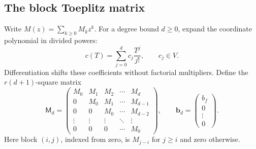 \documentclass[11pt,a4paper]{article}
\numberwithin{equation}{section}
\theoremstyle{definition}
\theoremstyle{remark}
\theoremstyle{definition}
\newcommand{\Tmat}{\mathsf M}
\begin{document}
\subsection{The block Toeplitz matrix}
Write $M(z)=\sum_{k\ge0}M_kz^k$. For a degree bound $d\ge0$, expand the coordinate polynomial in divided powers:
\begin{equation}
 c(T)=\sum_{j=0}^{d}c_j\frac{T^j}{j!},\qquad c_j\in V.
 \label{eq:divided}
\end{equation}
Differentiation shifts these coefficients without factorial multipliers. Define the $r(d+1)$-square matrix
\begin{equation}
 \Tmat_d=
 \begin{pmatrix}
 M_0&M_1&M_2&\cdots&M_d\\
 0&M_0&M_1&\cdots&M_{d-1}\\
 0&0&M_0&\cdots&M_{d-2}\\
 \vdots&\vdots&\vdots&\ddots&\vdots\\
 0&0&0&\cdots&M_0
 \end{pmatrix},
 \qquad
 \mathbf b_d=\begin{pmatrix}b_f\\0\\\vdots\\0\end{pmatrix}.
 \label{eq:toeplitz}
\end{equation}
Here block $(i,j)$, indexed from zero, is $M_{j-i}$ for $j\ge i$ and zero otherwise.
\end{document}
